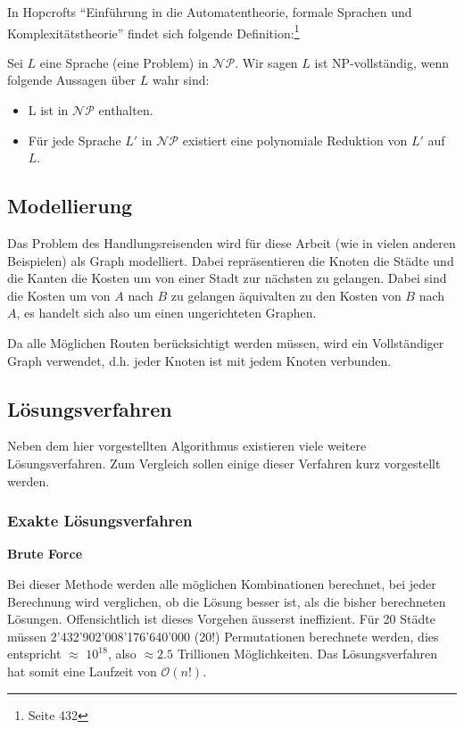 \documentclass[11pt,a4paper]{article}
\begin{document}
\medskip

In Hopcrofts "`Einführung in die Automatentheorie, formale Sprachen und Komplexitätstheorie"' findet sich folgende Definition:\footnote{\cite{hopcroft02} Seite 432}

Sei $L$ eine Sprache (eine Problem) in $\mathcal{NP}$. Wir sagen $L$ ist NP-vollständig, wenn folgende Aussagen über $L$ wahr sind:
\begin{itemize}
    \item L ist in $\mathcal{NP}$ enthalten.
    \item Für jede Sprache $L'$ in $\mathcal{NP}$ existiert eine polynomiale Reduktion von $L'$ auf $L$.
\end{itemize}


\subsection{Modellierung}
Das Problem des Handlungsreisenden wird für diese Arbeit (wie in vielen anderen Beispielen) als Graph modelliert. Dabei repräsentieren die Knoten die Städte und die Kanten die Kosten um von einer Stadt zur nächsten zu gelangen. Dabei sind die Kosten um von $A$ nach $B$ zu gelangen äquivalten zu den Kosten von $B$ nach $A$, es handelt sich also um einen ungerichteten Graphen.

Da alle Möglichen Routen berücksichtigt werden müssen, wird ein Vollständiger Graph verwendet, d.h. jeder Knoten ist mit jedem Knoten verbunden.

\subsection{Lösungsverfahren}
Neben dem hier vorgestellten Algorithmus existieren viele weitere Lösungsverfahren. Zum Vergleich sollen einige dieser Verfahren kurz vorgestellt werden.

\subsubsection{Exakte Lösungsverfahren}
\begin{flushleft}
\textbf{Brute Force}

Bei dieser Methode werden alle möglichen Kombinationen berechnet, bei jeder Berechnung wird verglichen, ob die Lösung besser ist, als die bisher berechneten Lösungen. Offensichtlich ist dieses Vorgehen äusserst ineffizient. Für 20 Städte müssen 2'432'902'008'176'640'000 (20!) Permutationen berechnete werden, dies entspricht $\approx$ $10^{18}$, also $\approx2.5$ Trillionen Möglichkeiten. Das Lösungsverfahren hat somit eine Laufzeit von $\mathcal O(n!)$.

\end{flushleft}
\end{document}
